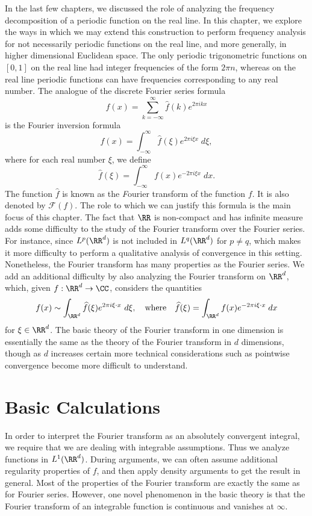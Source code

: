 In the last few chapters, we discussed the role of analyzing the frequency decomposition of a periodic function on the real line. In this chapter, we explore the ways in which we may extend this construction to perform frequency analysis for not necessarily periodic functions on the real line, and more generally, in higher dimensional Euclidean space. The only periodic trigonometric functions on $[0,1]$ on the real line had integer frequencies of the form $2\pi n$, whereas on the real line periodic functions can have frequencies corresponding to any real number. The analogue of the discrete Fourier series formula
%
\[ f(x) = \sum_{k = -\infty}^\infty \widehat{f}(k) e^{2 \pi i k x} \]
%
is the Fourier inversion formula
%
\[ f(x) = \int_{-\infty}^\infty \widehat{f}(\xi) e^{2 \pi i \xi x}\; d\xi, \]
%
where for each real number $\xi$, we define
%
\[ \widehat{f}(\xi) = \int_{-\infty}^\infty f(x) e^{- 2 \pi i \xi x}\; dx. \]
%
The function $\widehat{f}$ is known as the {\emph Fourier transform} of the function $f$. It is also denoted by $\mathcal{F}(f)$. The role to which we can justify this formula is the main focus of this chapter. The fact that $\RR$ is non-compact and has infinite measure adds some difficulty to the study of the Fourier transform over the Fourier series. For instance, since $L^p(\RR^d)$ is not included in $L^q(\RR^d)$ for $p \neq q$, which makes it more difficulty to perform a qualitative analysis of convergence in this setting. Nonetheless, the Fourier transform has many properties as the Fourier series. We add an additional difficulty by also analyzing the Fourier transform on $\RR^d$, which, given $f: \RR^d \to \CC$, considers the quantities
%
\[ f(x) \sim \int_{\RR^d} \widehat{f}(\xi) e^{2 \pi i \xi \cdot x}\ d\xi,\quad\text{where}\quad \widehat{f}(\xi) = \int_{\RR^d} f(x) e^{- 2 \pi i \xi \cdot x}\; dx \]
%
for $\xi \in \RR^d$. The basic theory of the Fourier transform in one dimension is essentially the same as the theory of the Fourier transform in $d$ dimensions, though as $d$ increases certain more technical considerations such as pointwise convergence become more difficult to understand.

\section{Basic Calculations}

In order to interpret the Fourier transform as an absolutely convergent integral, we require that we are dealing with integrable assumptions. Thus we analyze functions in $L^1(\RR^d)$. During arguments, we can often assume additional regularity properties of $f$, and then apply density arguments to get the result in general. Most of the properties of the Fourier transform are exactly the same as for Fourier series. However, one novel phenomenon in the basic theory is that the Fourier transform of an integrable function is continuous and vanishes at $\infty$.

